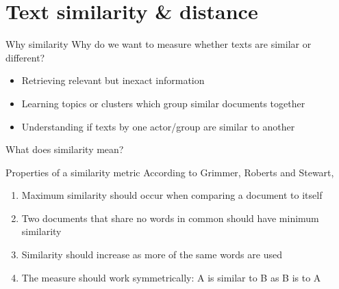 \documentclass[
  10pt,
  ignorenonframetext,
  aspectratio=169]{beamer}
\begin{document}
\hypertarget{text-similarity-distance}{%
\section{Text similarity \& distance}\label{text-similarity-distance}}

\begin{frame}{Why similarity}
\protect\hypertarget{why-similarity}{}
Why do we want to measure whether texts are similar or different?

\begin{itemize}
  \item<2-> Retrieving relevant but inexact information
  \item<3-> Learning topics or clusters which group similar documents together
  \item<4-> Understanding if texts by one actor/group are similar to another
\end{itemize}

What does similarity mean?
\end{frame}

\begin{frame}{Properties of a similarity metric}
\protect\hypertarget{properties-of-a-similarity-metric}{}
According to Grimmer, Roberts and Stewart,

\begin{enumerate}
  \item<1-> Maximum similarity should occur when comparing a document to itself
  \item<2-> Two documents that share no words in common should have minimum similarity
  \item<3-> Similarity should increase as more of the same words are used
  \item<4-> The measure should work symmetrically: A is similar to B as B is to A
\end{enumerate}
\end{frame}
\end{document}
